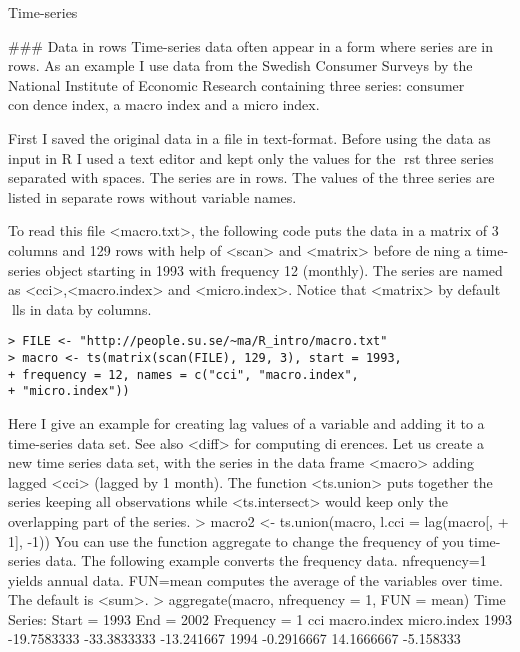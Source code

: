 
Time-series

### Data in rows
Time-series data often appear in a form where series are in rows. As an example
I use data from the Swedish Consumer Surveys by the National Institute of
Economic Research containing three series: consumer condence index, a macro
index and a micro index.

First I saved the original data in a file in text-format. Before using the data as
input in R I used a text editor and kept only the values for the rst three series
separated with spaces. The series are in rows. The values of the three series are
listed in separate rows without variable names.

To read this file <macro.txt>, the following code puts the data in a matrix of
3 columns and 129 rows with help of <scan> and <matrix> before dening a
time-series object starting in 1993 with frequency 12 (monthly). The series are
named as <cci>,<macro.index> and <micro.index>. Notice that <matrix>
by default lls in data by columns.

\begin{verbatim}
> FILE <- "http://people.su.se/~ma/R_intro/macro.txt"
> macro <- ts(matrix(scan(FILE), 129, 3), start = 1993,
+ frequency = 12, names = c("cci", "macro.index",
+ "micro.index"))
\end{verbatim}
Here I give an example for creating lag values of a variable and adding it to a
time-series data set. See also <diff> for computing dierences.
Let us create a new time series data set, with the series in the data frame
<macro> adding lagged <cci> (lagged by 1 month). The function <ts.union>
puts together the series keeping all observations while <ts.intersect> would
keep only the overlapping part of the series.
> macro2 <- ts.union(macro, l.cci = lag(macro[,
+ 1], -1))
You can use the function aggregate to change the frequency of you time-series
data. The following example converts the frequency data. nfrequency=1 yields
annual data. FUN=mean computes the average of the variables over time. The
default is <sum>.
> aggregate(macro, nfrequency = 1, FUN = mean)
Time Series:
Start = 1993
End = 2002
Frequency = 1
cci macro.index micro.index
1993 -19.7583333 -33.3833333 -13.241667
1994 -0.2916667 14.1666667 -5.158333
